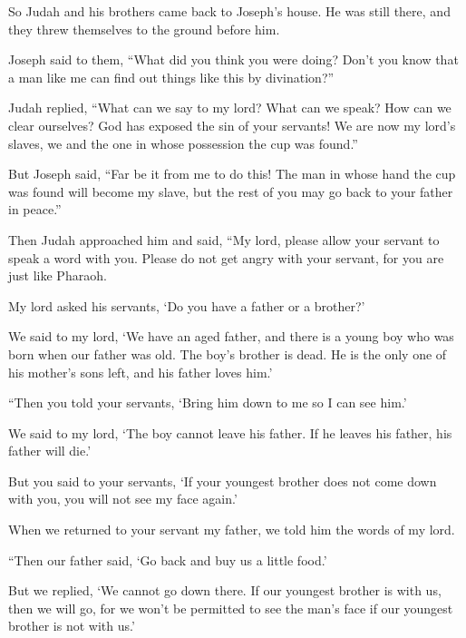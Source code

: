 \begin{scripture}
 So Judah and his brothers came back to Joseph's house. He was still there, and they threw themselves to the ground before him.
 Joseph said to them, ``What did you think you were doing? Don't you know that a man like me can find out things like this by divination?''
\everypar{}

 Judah replied, ``What can we say to my lord? What can we speak? How can we clear ourselves? God has exposed the sin of your servants! We are now my lord's slaves, we and the one in whose possession the cup was found.''
\everypar{}

 But Joseph said, ``Far be it from me to do this! The man in whose hand the cup was found will become my slave, but the rest of you may go back to your father in peace.''
\everypar{}

 Then Judah approached him and said, ``My lord, please allow your servant to speak a word with you. Please do not get angry with your servant, for you are just like Pharaoh.
 My lord asked his servants, `Do you have a father or a brother?'
 We said to my lord, `We have an aged father, and there is a young boy who was born when our father was old. The boy's brother is dead. He is the only one of his mother's sons left, and his father loves him.'
\everypar{}

 ``Then you told your servants, `Bring him down to me so I can see him.'
 We said to my lord, `The boy cannot leave his father. If he leaves his father, his father will die.'
 But you said to your servants, `If your youngest brother does not come down with you, you will not see my face again.'
 When we returned to your servant my father, we told him the words of my lord.
\everypar{}

 ``Then our father said, `Go back and buy us a little food.'
 But we replied, `We cannot go down there. If our youngest brother is with us, then we will go, for we won't be permitted to see the man's face if our youngest brother is not with us.'
\everypar{}


\end{scripture}
